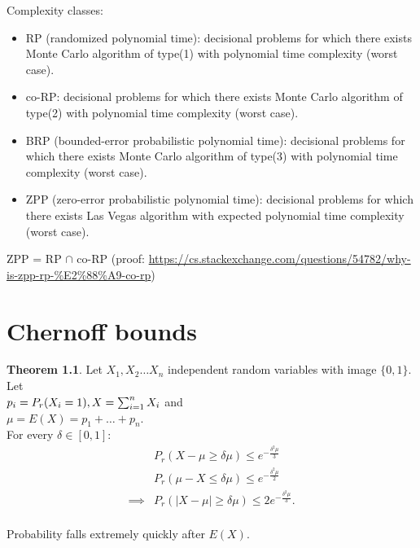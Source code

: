 \documentclass[a4paper, 12pt]{book}
\theoremstyle{definition}
\newtheorem{theorem}[counter]{Theorem}
\theoremstyle{remark}
\begin{document}
Complexity classes:
\begin{itemize}
  \item RP (randomized polynomial time): decisional problems for which there exists Monte Carlo algorithm of type(1)
    with polynomial time complexity (worst case).
  \item co-RP: decisional problems for which there exists Monte Carlo algorithm of type(2) with polynomial time complexity
    (worst case).
  \item BRP (bounded-error probabilistic polynomial time): decisional problems for which there exists Monte Carlo algorithm of type(3)
    with polynomial time complexity (worst case).
  \item ZPP (zero-error probabilistic polynomial time): decisional problems for which there exists Las Vegas algorithm
    with expected polynomial time complexity (worst case).
\end{itemize}
ZPP = RP $\cap$ co-RP (proof: \url{https://cs.stackexchange.com/questions/54782/why-is-zpp-rp-%E2%88%A9-co-rp})



\chapter{Chernoff bounds}


\begin{theorem}
  Let $X_1, X_2 \dots X_n$ independent random variables with image $\{0, 1\}$. Let \\
  $p_i = P_r(X_i = 1), \\
  X = \sum_{i=1}^{n} X_i$ and \\
  $\mu = E(X) = p_1 + \dots + p_n$. \\
  For every $\delta \in [0,1]$:
  \begin{align*}
    &P_r(X - \mu \geq \delta \mu) \leq e^{-\frac{\delta^2 \mu}{3}} \\
    &P_r(\mu - X \leq \delta \mu) \leq e^{-\frac{\delta^2 \mu}{2}} \\
    \implies &P_r(|X - \mu| \geq \delta \mu) \leq 2e^{-\frac{\delta^2 \mu}{3}}. \\
  \end{align*}
\end{theorem}
Probability falls extremely quickly after $E(X)$.


\end{document}
